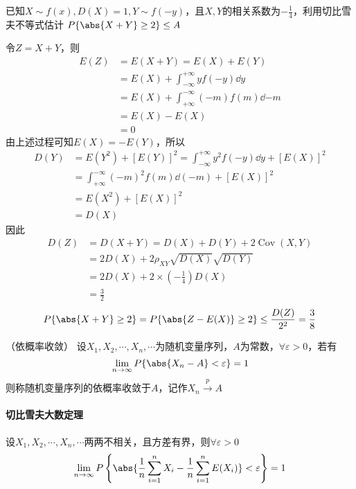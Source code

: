 \begin{example}
    已知$X\sim f(x), D(X) = 1, Y\sim f(-y)$，且$X,Y$的相关系数为$-\frac{1}{4}$，利用切比雪夫不等式估计
    $P\{\abs{X+Y}\geq 2\} \leq A$
\end{example}
\begin{solution}
    令$Z=X+Y$，则
    \begin{align*}
        E(Z) & = E(X+Y) = E(X) + E(Y)                            \\
             & = E(X) + \int_{-\infty}^{+\infty} yf(-y)\dd{y}    \\
             & = E(X) + \int_{+\infty}^{-\infty} (-m)f(m)\dd{-m} \\
             & =E(X) - E(X)                                      \\
             & = 0
    \end{align*}
    由上述过程可知$E(X)=-E(Y)$，所以
    \begin{align*}
        D(Y) & = E(Y^2)+[E(Y)]^2 = \int_{-\infty}^{+\infty} y^2f(-y)\dd{y} + [E(X)]^2 \\
             & =\int_{+\infty}^{-\infty} (-m)^2f(m)\dd(-m)+ [E(X)]^2                  \\
             & =E(X^2)+[E(X)]^2                                                       \\
             & =D(X)
    \end{align*}
    因此
    \begin{align*}
        D(Z) & = D(X+Y) = D(X)+D(Y) +2\operatorname{Cov}(X,Y) \\
             & = 2D(X)+ 2\rho_{XY}\sqrt{D(X)}\sqrt{D(Y)}      \\
             & = 2D(X) + 2\times\left(-\frac{1}{4}\right)D(X) \\
             & = \frac{3}{2}
    \end{align*}
    \[ P\{\abs{X+Y}\geq 2\}  = P\{ \abs{Z-E(X)}\geq 2 \} \leq \frac{D(Z)}{2^2}=\frac{3}{8} \]
\end{solution}

\begin{definition}
    （依概率收敛）
    设$X_1,X_2,\cdots,X_n,\cdots$为随机变量序列，$A$为常数，$\forall \varepsilon >0$，若有
    \[ \lim_{n\to \infty} P\{\abs{X_n - A} < \varepsilon \} = 1  \]
    则称随机变量序列的依概率收敛于$A$，记作$X_n \xrightarrow{p} A$
\end{definition}

\paragraph{切比雪夫大数定理}
设$X_1,X_2,\cdots,X_n,\cdots$两两不相关，且方差有界，则$\forall \varepsilon >0$
\begin{equation}
    \label{eq:切比雪夫大数定理}
    \lim_{n\to\infty} P\left\{ \abs{\frac{1}{n}\sum_{i=1}^n X_i - \frac{1}{n}\sum_{i=1}^n E(X_i)} < \varepsilon \right\} = 1
\end{equation}

